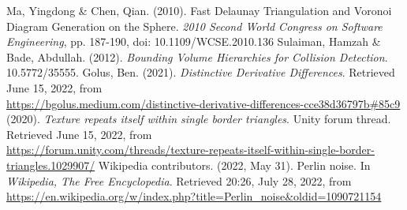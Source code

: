 \begin{thebibliography}{9}
Ma,  Yingdong \& Chen, Qian. (2010). Fast Delaunay Triangulation and Voronoi Diagram Generation on the Sphere. \textit{2010 Second World Congress on Software Engineering},  pp. 187-190, doi: 10.1109/WCSE.2010.136
Sulaiman, Hamzah \& Bade, Abdullah. (2012). \textit{Bounding Volume Hierarchies for Collision Detection}. 10.5772/35555.
Golus, Ben. (2021). \textit{Distinctive Derivative Differences}. Retrieved June 15, 2022, from\\ \url{https://bgolus.medium.com/distinctive-derivative-differences-cce38d36797b\#85c9}
(2020). \textit{Texture repeats itself within single border triangles}. Unity forum thread. Retrieved June 15, 2022, from\\ \url{https://forum.unity.com/threads/texture-repeats-itself-within-single-border-triangles.1029907/}
Wikipedia contributors. (2022, May 31). Perlin noise. In \textit{Wikipedia, The Free Encyclopedia}. Retrieved 20:26, July 28, 2022, from \url{https://en.wikipedia.org/w/index.php?title=Perlin\_noise\&oldid=1090721154}
\end{thebibliography}